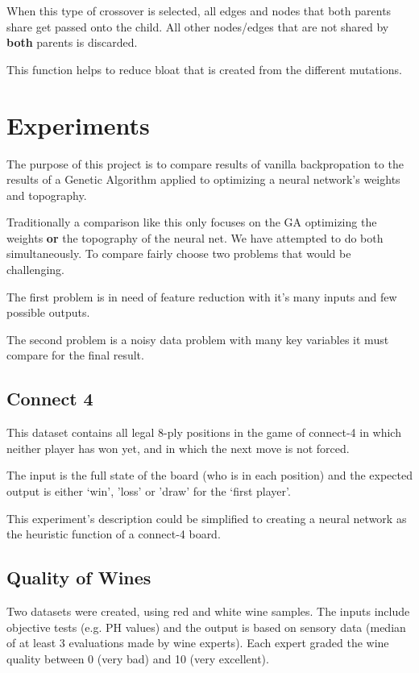 \documentclass[journal]{IEEEtran}
\begin{document}
    When this type of crossover is selected, all edges and nodes that both parents share get
    passed onto the child. All other nodes/edges that are not shared by \textbf{both} parents
    is discarded.  \cite{lachlan}

    This function helps to reduce bloat that is created from the different mutations.

\section{Experiments}
  The purpose of this project is to compare results of vanilla backpropation to the results of
  a Genetic Algorithm applied to optimizing a neural network's weights and topography.

  Traditionally a comparison like this only focuses on the GA optimizing the weights \textbf{or}
  the topography of the neural net. We have attempted to do both simultaneously. To compare fairly
  choose two problems that would be challenging.

  The first problem is in need of feature reduction with it's many inputs and few possible outputs.

  The second problem is a noisy data problem with many key variables it must compare for the final
  result.

  \subsection{Connect 4}
   This dataset contains all legal 8-ply positions in the game of
   connect-4 in which neither player has won yet, and in which the next
   move is not forced.

   The input is the full state of the board (who is in each position) and the expected output
   is either `win', 'loss' or 'draw' for the `first player'.

   This experiment's description could be simplified to creating a neural network as the heuristic
   function of a connect-4 board.

  \subsection{Quality of Wines}
  Two datasets were created, using red and white wine samples.
  The inputs include objective tests (e.g. PH values) and the output is based on sensory data
  (median of at least 3 evaluations made by wine experts). Each expert graded the wine quality
  between 0 (very bad) and 10 (very excellent).
\end{document}
